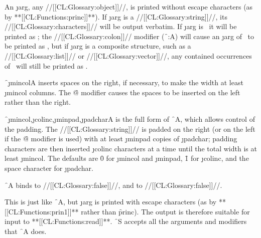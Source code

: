 \endsubsubsection%

\endsubsection%








An \j{arg}, any //[[CL:Glossary:object]]//, 
is printed without escape characters
(as by **[[CL:Functions:princ]]**).  If \j{arg} is a //[[CL:Glossary:string]]//, 
its //[[CL:Glossary:characters]]//
will be output verbatim.
If \j{arg} is \nil\ it will be printed as \nil;
the //[[CL:Glossary:colon]]// modifier (\f{~:A}) will cause an \j{arg} of \nil\ to be printed as \empty,
but if \j{arg} is a composite structure, such as a //[[CL:Glossary:list]]// or //[[CL:Glossary:vector]]//,
any contained occurrences of \nil\ will still be printed as \nil.


\f{~\j{mincol}A} inserts spaces on the right, if necessary, to make the
width at least \j{mincol} columns.  The \f{@}
modifier causes the spaces
to be inserted on the left rather than the right.


\f{~\j{mincol},\j{colinc},\j{minpad},\j{padchar}A} 
is the full form of \f{~A},
which allows control of the padding.
The //[[CL:Glossary:string]]// is padded on the right (or on the left if the
\f{@} modifier is used) with at least \j{minpad} copies
of \j{padchar}; padding characters are then inserted \j{colinc} characters
at a time until the total width is at least \j{mincol}.
The defaults are \f{0} for \j{mincol} and \j{minpad}, \f{1} for \j{colinc},
and the space character for \j{padchar}.

\f{~A} binds  to //[[CL:Glossary:false]]//,
and  to //[[CL:Glossary:false]]//.



\endsubsubsection%








This is just like \f{~A}, but \j{arg} is printed with escape
characters (as by **[[CL:Functions:prin1]]** rather than \f{princ}).  The output is
therefore suitable for input to **[[CL:Functions:read]]**.  \f{~S} accepts
all the arguments and modifiers that \f{~A} does.

